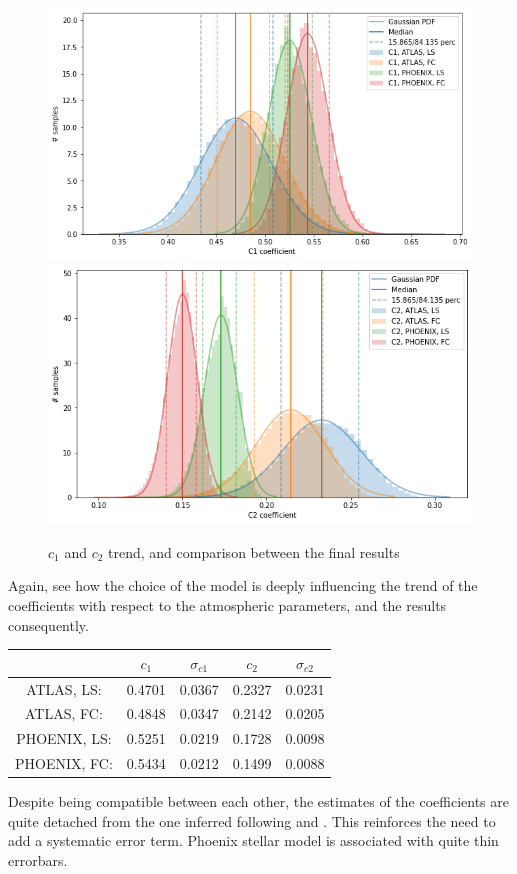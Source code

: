 \documentclass[a4paper,11pt,twocolumn]{article}
\begin{document}
\begin{figure}[H]
    \includegraphics[scale=0.35, angle=0]{../pictures/Claret2011/c1_comp.png}
    \includegraphics[scale=0.35, angle=0]{../pictures/Claret2011/c2_comp.png}
    \caption{$c_1$ and $c_2$ trend, and comparison between the final results}
\end{figure}
Again, see how the choice of the model is deeply influencing the trend of 
the coefficients with respect to the atmospheric parameters, and the results 
consequently. 
\begin{table}[h!]
	\centering
	\begin{tabular}{ccccc}
		\hline
		& $c_1$ & $\sigma_{c1}$ & $c_2$ & $\sigma_{c2}$\\
		\hline
		ATLAS, LS:      & 0.4701 & 0.0367 &0.2327 &0.0231 \\
		ATLAS, FC:      & 0.4848 & 0.0347 & 0.2142 &  0.0205 \\
		PHOENIX, LS:    & 0.5251 & 0.0219 & 0.1728 & 0.0098 \\
		PHOENIX, FC:    & 0.5434 & 0.0212 &  0.1499 & 0.0088 \\
        \hline
	\end{tabular} 
\end{table}
Despite being compatible between each other, the estimates of 
the coefficients are quite detached from the one inferred following 
\cite{claret2017} and \cite{claret2018}. This reinforces the need to add 
a systematic error term. Phoenix stellar model is associated with quite 
thin errorbars.
\end{document}
